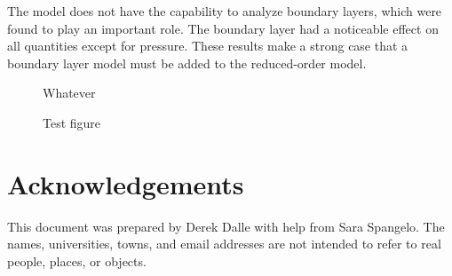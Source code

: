 \documentclass[journal,backrefs]{../aiaa-pretty}
\begin{document}
The model does not have the capability to analyze boundary layers, which were found to play an important role.  The boundary layer had a noticeable effect on all quantities except for pressure.  These results make a strong case that a boundary layer model must be added to the reduced-order model.

\begin{figure}[!h]
 \begin{center}
  Whatever
 \end{center}
 \caption{Test figure}
\end{figure}



\section*{Acknowledgements}
This document was prepared by Derek Dalle with help from Sara Spangelo.  The names, universities, towns, and email addresses are not intended to refer to real people, places, or objects.



\end{document}
